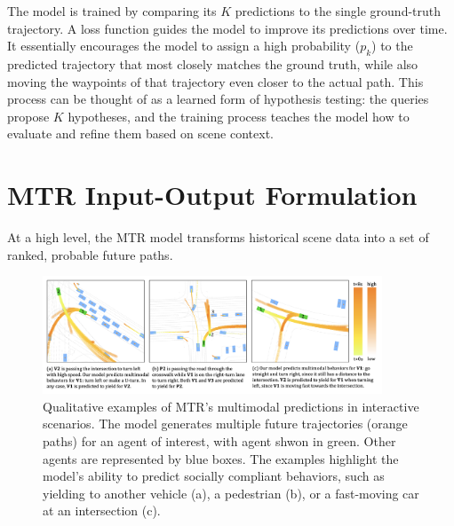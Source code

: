 The model is trained by comparing its $K$ predictions to the single ground-truth trajectory. A loss function guides the model to improve its predictions over time. It essentially encourages the model to assign a high probability ($p_k$) to the predicted trajectory that most closely matches the ground truth, while also moving the waypoints of that trajectory even closer to the actual path. This process can be thought of as a learned form of hypothesis testing: the queries propose $K$ hypotheses, and the training process teaches the model how to evaluate and refine them based on scene context.

\section{MTR Input-Output Formulation}
\label{sec:model_mtr_io}

At a high level, the MTR model transforms historical scene data into a set of ranked, probable future paths.

\begin{figure}[htbp]
    \centering
    \includegraphics[width=0.9\textwidth]{figures/input_output_viz.png}
    \caption{Qualitative examples of MTR's multimodal predictions in interactive scenarios. The model generates multiple future trajectories (orange paths) for an agent of interest, with agent shwon in green. Other agents are represented by blue boxes. The examples highlight the model's ability to predict socially compliant behaviors, such as yielding to another vehicle (a), a pedestrian (b), or a fast-moving car at an intersection (c).}
    \label{fig:input_output_example}
\end{figure}

